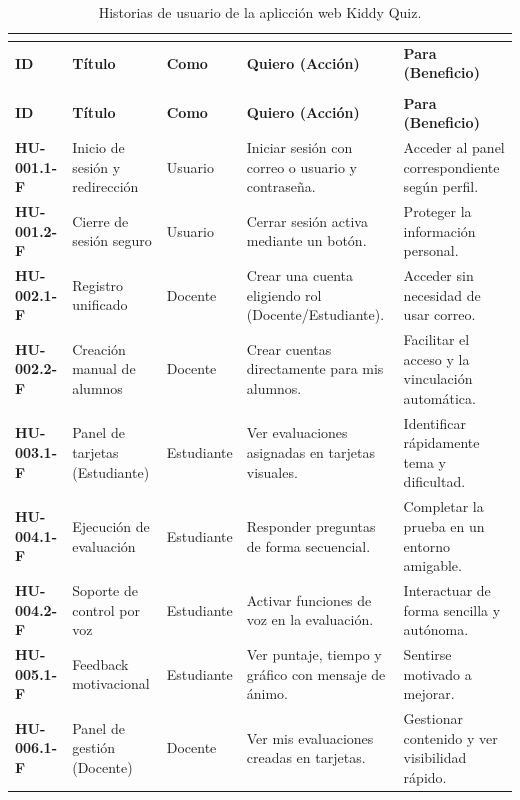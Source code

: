 \begin{small}
\begin{longtable}{|>{\bfseries}p{2.0cm}|p{2.5cm}|p{1.7cm}|p{3.7cm}|p{3.5cm}|}
\caption{Historias de usuario de la aplicción web Kiddy Quiz.}\label{tab:hu}\\
\hline\rowcolor{headblue}\multicolumn{5}{|c|}{\textbf{Aplicación web Kiddy Quiz}}\\\hline
\rowcolor{grpgray}\textbf{ID} & \textbf{Título} & \textbf{Como} & \textbf{Quiero (Acción)} & \textbf{Para (Beneficio)}\\\hline
\endfirsthead
\hline\rowcolor{headblue}\multicolumn{5}{|c|}{\textbf{Aplicación web Kiddy Quiz (continuación)}}\\\hline
\rowcolor{grpgray}\textbf{ID} & \textbf{Título} & \textbf{Como} & \textbf{Quiero (Acción)} & \textbf{Para (Beneficio)}\\\hline
\endhead
\hline\endlastfoot
HU-001.1-F & Inicio de sesión y redirección & Usuario & Iniciar sesión con correo o usuario y contraseña. & Acceder al panel correspondiente según perfil. \\\hline
HU-001.2-F & Cierre de sesión seguro & Usuario & Cerrar sesión activa mediante un botón. & Proteger la información personal. \\\hline
HU-002.1-F & Registro unificado & Docente & Crear una cuenta eligiendo rol (Docente/Estudiante). & Acceder sin necesidad de usar correo. \\\hline
HU-002.2-F & Creación manual de alumnos & Docente & Crear cuentas directamente para mis alumnos. & Facilitar el acceso y la vinculación automática. \\\hline
HU-003.1-F & Panel de tarjetas (Estudiante) & Estudiante & Ver evaluaciones asignadas en tarjetas visuales. & Identificar rápidamente tema y dificultad. \\\hline
HU-004.1-F & Ejecución de evaluación & Estudiante & Responder preguntas de forma secuencial. & Completar la prueba en un entorno amigable. \\\hline
HU-004.2-F & Soporte de control por voz & Estudiante & Activar funciones de voz en la evaluación. & Interactuar de forma sencilla y autónoma. \\\hline
HU-005.1-F & Feedback motivacional & Estudiante & Ver puntaje, tiempo y gráfico con mensaje de ánimo. & Sentirse motivado a mejorar. \\\hline
HU-006.1-F & Panel de gestión (Docente) & Docente & Ver mis evaluaciones creadas en tarjetas. & Gestionar contenido y ver visibilidad rápido. \\\hline

\end{longtable}
\end{small}
